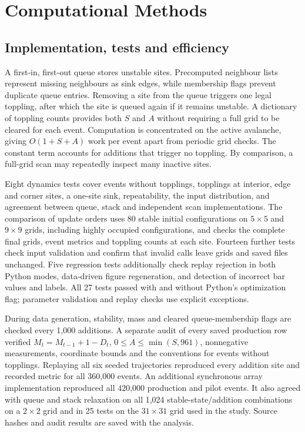 \documentclass[11pt,a4paper,oneside]{report}
\numberwithin{equation}{chapter}
\begin{document}
\chapter{Computational Methods}
\label{ch:methods}
\section{Implementation, tests and efficiency}
A first-in, first-out queue stores unstable sites. Precomputed neighbour lists represent missing neighbours as sink edges, while membership flags prevent duplicate queue entries. Removing a site from the queue triggers one legal toppling, after which the site is queued again if it remains unstable. A dictionary of toppling counts provides both $S$ and $A$ without requiring a full grid to be cleared for each event. Computation is concentrated on the active avalanche, giving $O(1+S+A)$ work per event apart from periodic grid checks. The constant term accounts for additions that trigger no toppling. By comparison, a full-grid scan may repeatedly inspect many inactive sites.

Eight dynamics tests cover events without topplings, topplings at interior, edge and corner sites, a one-site sink, repeatability, the input distribution, and agreement between queue, stack and independent scan implementations. The comparison of update orders uses 80 stable initial configurations on $5\times5$ and $9\times9$ grids, including highly occupied configurations, and checks the complete final grids, event metrics and toppling counts at each site. Fourteen further tests check input validation and confirm that invalid calls leave grids and saved files unchanged. Five regression tests additionally check replay rejection in both Python modes, data-driven figure regeneration, and detection of incorrect bar values and labels. All 27 tests passed with and without Python's optimization flag; parameter validation and replay checks use explicit exceptions.

During data generation, stability, mass and cleared queue-membership flags are checked every 1,000 additions. A separate audit of every saved production row verified $M_t=M_{t-1}+1-D_t$, $0\leq A\leq\min(S,961)$, nonnegative measurements, coordinate bounds and the conventions for events without topplings. Replaying all six seeded trajectories reproduced every addition site and recorded metric for all 360,000 events. An additional synchronous array implementation reproduced all 420,000 production and pilot events. It also agreed with queue and stack relaxation on all 1,024 stable-state/addition combinations on a $2\times2$ grid and in 25 tests on the $31\times31$ grid used in the study. Source hashes and audit results are saved with the analysis.
\end{document}
